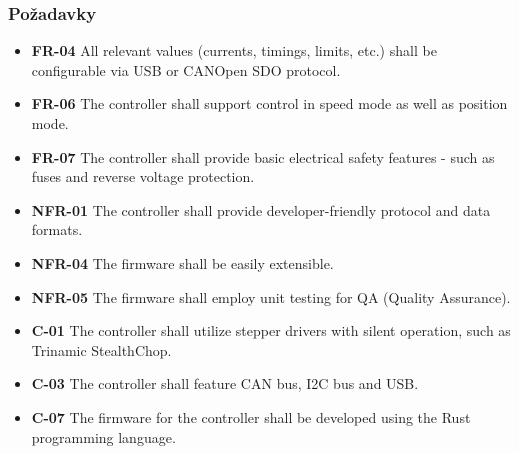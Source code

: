 \documentclass[%
  12pt,       				%
	t,                  %
	aspectratio=1610,   %
	unicode,						%
]{beamer}				    	%
\begin{document}
\begin{frame}
	\frametitle{Požadavky}
	\begin{itemize}
		\item \textbf{FR-04} All relevant values (currents, timings, limits, etc.) shall be configurable via USB or CANOpen SDO protocol.
		\item \textbf{FR-06} The controller shall support control in speed mode as well as position mode.
		\item \textbf{FR-07} The controller shall provide basic electrical safety features - such as fuses and reverse voltage protection.
		\item \textbf{NFR-01} The controller shall provide developer-friendly protocol and data formats.
		\item \textbf{NFR-04} The firmware shall be easily extensible.
		\item \textbf{NFR-05} The firmware shall employ unit testing for QA (Quality Assurance).
		\item \textbf{C-01} The controller shall utilize stepper drivers with silent operation, such as Trinamic StealthChop\texttrademark.
		\item \textbf{C-03} The controller shall feature CAN bus, I2C bus and USB.
		\item \textbf{C-07} The firmware for the controller shall be developed using the Rust programming language.
	\end{itemize}
\end{frame}
\end{document}
